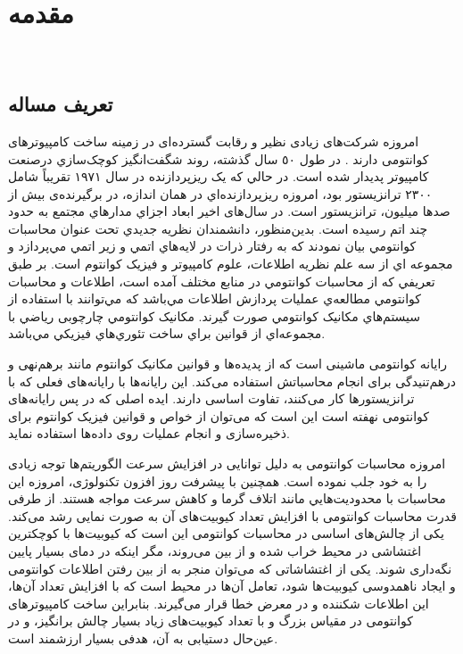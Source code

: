\chapter{مقدمه}
\newpage
‎\renewcommand{\baselinestretch}{2}\normalsize‎
\label{introduction}
\section{تعریف مساله}



امروزه شرکت‌های زیادی نظیر  و  رقابت گسترده‌ای در زمینه ساخت کامپیوترهای کوانتومی دارند \cite{cuomo2020towards,cacciapuoti2020entanglement,caleffi2018quantum,cacciapuoti2019quantum}. در طول ٥٠ سال گذشته، روند شگفت‌انگيز کوچک‌سازي درصنعت کامپيوتر پديدار شده است. در حالي که يک ريزپردازنده در سال ١٩٧١ تقريباً شامل ٢٣٠٠ ترانزيستور بود، امروزه ريزپردازنده‌اي در همان اندازه، در برگيرنده‌ی بيش از صدها ميليون، ترانزيستور است. در سال‌های اخیر ابعاد اجزاي مدارهاي مجتمع به حدود چند اتم رسیده است. بدين‌منظور، دانشمندان نظريه جديدي تحت عنوان محاسبات کوانتومي بيان نمودند که به رفتار ذرات در لايه‌هاي اتمي و زير اتمي مي‌پردازد و مجموعه اي از سه علم نظريه اطلاعات،
علوم كامپيوتر و فيزيک کوانتوم است.
بر طبق تعريفي که از محاسبات کوانتومي در منابع مختلف آمده است، اطلاعات و محاسبات کوانتومي مطالعه‌ي عمليات پردازش اطلاعات مي‌باشد که مي‌توانند با استفاده از سيستم‌هاي مکانيک کوانتومي صورت گيرند. مکانيک کوانتومي چارچوبی رياضي با مجموعه‌اي از قوانين براي ساخت تئوري‌هاي فيزيکي مي‌باشد\cite{mcmahon2007quantum}.

رایانه کوانتومی ماشینی است که از پدیده‌ها و قوانین مکانیک کوانتوم مانند برهم‌نهی و درهم‌تنیدگی برای انجام محاسباتش استفاده می‌کند. این رایانه‌ها با رایانه‌های فعلی که با ترانزیستورها کار می‌کنند، تفاوت اساسی دارند. ایده اصلی که در پس رایانه‌های کوانتومی نهفته است این است که می‌توان از خواص و قوانین فیزیک کوانتوم برای ذخیره‌سازی و انجام عملیات روی داده‌ها استفاده نماید.

امروزه محاسبات کوانتومی به دلیل توانایی در افزایش سرعت الگوریتم‌ها توجه زیادی را به خود جلب نموده است. همچنین با پیشرفت روز افزون تکنولوژی، امروزه این محاسبات با محدودیت‌هايي مانند اتلاف گرما و کاهش سرعت مواجه هستند. از طرفی قدرت محاسبات کوانتومی با افزایش تعداد کیوبیت‌های آن به صورت نمایی رشد می‌کند\cite{cacciapuoti2019quantum}. یکی از چالش‌های اساسی در محاسبات کوانتومی این است که کیوبیت‌ها با کوچکترین اغتشاشی در محیط خراب شده و از بین می‌روند، مگر اینکه در دمای بسیار پایین نگه‌داری شوند. یکی از اغتشاشاتی که می‌توان منجر به از بین رفتن اطلاعات کوانتومی و ایجاد ناهمدوسی کیوبیت‌ها شود، تعامل آن‌ها در محیط است که با افزایش تعداد آن‌ها، این اطلاعات شکننده و در معرض خطا قرار می‌گیرند. بنابراین ساخت کامپیوترهای کوانتومی در مقیاس بزرگ و با تعداد کیوبیت‌های زیاد بسیار چالش برانگیز، و در عین‌حال دستیابی به آن، هدفی بسیار ارزشمند است.

